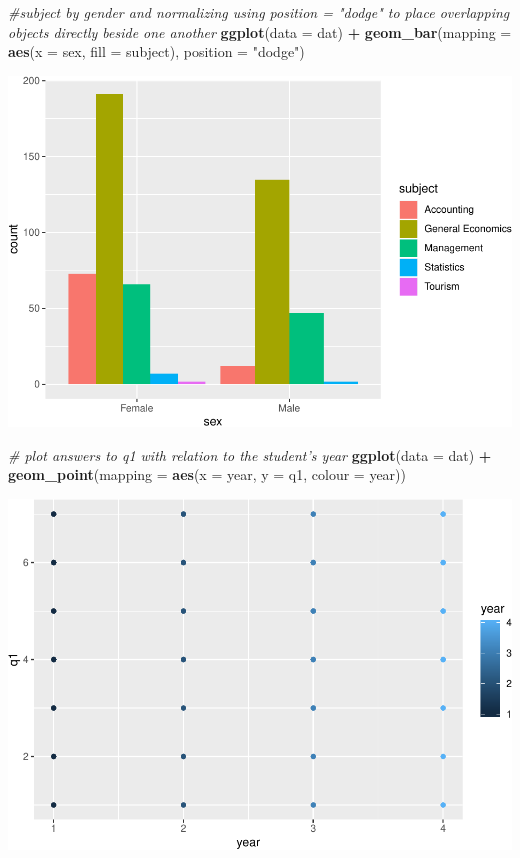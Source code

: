 \documentclass[]{article}
\newenvironment{Shaded}{\begin{snugshade}}{\end{snugshade}}
\newcommand{\CommentTok}[1]{\textcolor[rgb]{0.56,0.35,0.01}{\textit{#1}}}
\newcommand{\DataTypeTok}[1]{\textcolor[rgb]{0.13,0.29,0.53}{#1}}
\newcommand{\KeywordTok}[1]{\textcolor[rgb]{0.13,0.29,0.53}{\textbf{#1}}}
\newcommand{\NormalTok}[1]{#1}
\newcommand{\OperatorTok}[1]{\textcolor[rgb]{0.81,0.36,0.00}{\textbf{#1}}}
\newcommand{\StringTok}[1]{\textcolor[rgb]{0.31,0.60,0.02}{#1}}
\begin{document}
\begin{Shaded}
\begin{Highlighting}[]
\CommentTok{#subject by gender and normalizing using position = "dodge" to place overlapping objects directly beside one another}
\KeywordTok{ggplot}\NormalTok{(}\DataTypeTok{data =}\NormalTok{ dat) }\OperatorTok{+}\StringTok{ }
\StringTok{  }\KeywordTok{geom_bar}\NormalTok{(}\DataTypeTok{mapping =} \KeywordTok{aes}\NormalTok{(}\DataTypeTok{x =}\NormalTok{ sex, }\DataTypeTok{fill =}\NormalTok{ subject), }\DataTypeTok{position =} \StringTok{"dodge"}\NormalTok{)}
\end{Highlighting}
\end{Shaded}

\includegraphics{StudentGoals_files/figure-latex/unnamed-chunk-11-14.pdf}

\begin{Shaded}
\begin{Highlighting}[]
\CommentTok{# plot answers to q1 with relation to the student's year}
\KeywordTok{ggplot}\NormalTok{(}\DataTypeTok{data =}\NormalTok{ dat) }\OperatorTok{+}\StringTok{ }
\StringTok{  }\KeywordTok{geom_point}\NormalTok{(}\DataTypeTok{mapping =} \KeywordTok{aes}\NormalTok{(}\DataTypeTok{x =}\NormalTok{ year, }\DataTypeTok{y =}\NormalTok{ q1, }\DataTypeTok{colour =}\NormalTok{ year))}
\end{Highlighting}
\end{Shaded}

\includegraphics{StudentGoals_files/figure-latex/unnamed-chunk-11-15.pdf}
\end{document}
